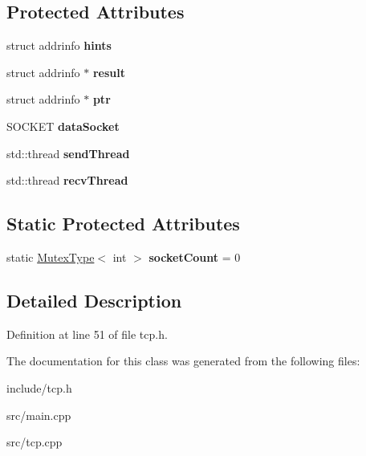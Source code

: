 \subsection*{Protected Attributes}
\begin{DoxyCompactItemize}
\item 
\hypertarget{classpersonal_robotics_1_1_tcp_a485934a2d97243ae1cf40b0191454975}{}struct addrinfo {\bfseries hints}\label{classpersonal_robotics_1_1_tcp_a485934a2d97243ae1cf40b0191454975}

\item 
\hypertarget{classpersonal_robotics_1_1_tcp_aa22ed1c8a0ba5346baeb6bb99501890b}{}struct addrinfo $\ast$ {\bfseries result}\label{classpersonal_robotics_1_1_tcp_aa22ed1c8a0ba5346baeb6bb99501890b}

\item 
\hypertarget{classpersonal_robotics_1_1_tcp_a3d5f0f540b53d0afeff9351d3c803355}{}struct addrinfo $\ast$ {\bfseries ptr}\label{classpersonal_robotics_1_1_tcp_a3d5f0f540b53d0afeff9351d3c803355}

\item 
\hypertarget{classpersonal_robotics_1_1_tcp_a2da418dc4a1a5f0f5203042faca7d411}{}S\+O\+C\+K\+E\+T {\bfseries data\+Socket}\label{classpersonal_robotics_1_1_tcp_a2da418dc4a1a5f0f5203042faca7d411}

\item 
\hypertarget{classpersonal_robotics_1_1_tcp_acb8526298559a4c1ed190489319ee214}{}std\+::thread {\bfseries send\+Thread}\label{classpersonal_robotics_1_1_tcp_acb8526298559a4c1ed190489319ee214}

\item 
\hypertarget{classpersonal_robotics_1_1_tcp_a60ddfe1ff552e790a686002e1b741d37}{}std\+::thread {\bfseries recv\+Thread}\label{classpersonal_robotics_1_1_tcp_a60ddfe1ff552e790a686002e1b741d37}

\end{DoxyCompactItemize}
\subsection*{Static Protected Attributes}
\begin{DoxyCompactItemize}
\item 
\hypertarget{classpersonal_robotics_1_1_tcp_ab4c9fa15800238ee07083ba03afb9ca3}{}static \hyperlink{classpersonal_robotics_1_1_mutex_type}{Mutex\+Type}$<$ int $>$ {\bfseries socket\+Count} = 0\label{classpersonal_robotics_1_1_tcp_ab4c9fa15800238ee07083ba03afb9ca3}

\end{DoxyCompactItemize}


\subsection{Detailed Description}


Definition at line 51 of file tcp.\+h.



The documentation for this class was generated from the following files\+:\begin{DoxyCompactItemize}
\item 
include/tcp.\+h\item 
src/main.\+cpp\item 
src/tcp.\+cpp\end{DoxyCompactItemize}
